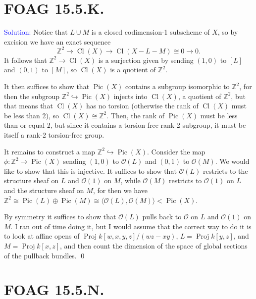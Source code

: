 \documentclass[11pt]{article}
\newcommand{\ZZ}{\mathbb{Z}}
\newcommand{\cO}{\mathcal{O}}
\newcommand{\Proj}{\operatorname{Proj}}
\newcommand{\Pic}{\operatorname{Pic}}
\newcommand{\Cl}{\operatorname{Cl}}
\newenvironment{solution}{\begin{trivlist}\item[]{\textcolor{blue}{Solution:}}}{\qed \end{trivlist}}
\begin{document}
\newpage

\section*{FOAG 15.5.K.}

\begin{solution}
    Notice that $L \cup M$ is a closed codimension-1 subscheme of $X$, so by excision we have an exact sequence 
    \begin{equation*}
        \ZZ^2 \longrightarrow \Cl(X) \longrightarrow \Cl(X - L - M) \cong 0 \longrightarrow 0.
    \end{equation*}
    It follows that $\ZZ^2 \rightarrow \Cl(X)$ is a surjection given by sending $(1,0)$ to $[L]$ and $(0,1)$ to $[M]$, so $\Cl(X)$ is a quotient of $\ZZ^2$. 

    It then suffices to show that $\Pic (X)$ contains a subgroup isomorphic to $\ZZ^2$, for then the subgroup $\ZZ^2 \hookrightarrow \Pic (X)$ injects into $\Cl(X)$, a quotient of $\ZZ^2$, but that means that $\Cl(X)$ has no torsion (otherwise the rank of $\Cl(X)$ must be less than 2), so $\Cl(X) \cong \ZZ^2$. Then, the rank of $\Pic(X)$ must be less than or equal 2, but since it contains a torsion-free rank-2 subgroup, it must be itself a rank-2 torsion-free group. 

    It remains to construct a map $\ZZ^2 \hookrightarrow \Pic(X)$. Consider the map $\phi: \ZZ^2 \rightarrow \Pic(X)$ sending $(1,0)$ to $\cO(L)$ and $(0,1)$ to $\cO(M)$. We would like to show that this is injective. It suffices to show that $\cO(L)$ restricts to the structure sheaf on $L$ and $\cO(1)$ on $M$, while $\cO(M)$ restricts to $\cO(1)$ on $L$ and the structure sheaf on $M$, for then we have $\ZZ^2 \cong \Pic(L) \oplus \Pic(M) \cong \langle \cO(L), \cO(M) \rangle < \Pic(X)$. 

    By symmetry it suffices to show that $\cO(L)$ pulls back to $\cO$ on $L$ and $\cO(1)$ on $M$. I ran out of time doing it, but I would assume that the correct way to do it is to look at affine opens of $\Proj k[w,x,y,z] / (wz - xy)$, $L = \Proj k[y, z]$, and $M = \Proj k[x, z]$, and then count the dimension of the space of global sections of the pullback bundles. 
\end{solution}

\newpage

\section*{FOAG 15.5.N.}
\end{document}
